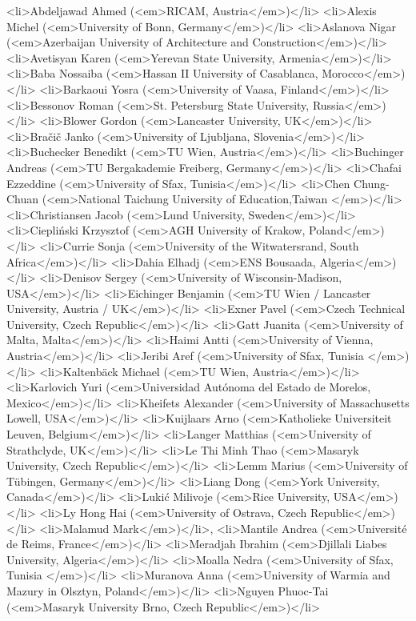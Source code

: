 <li>Abdeljawad Ahmed (<em>RICAM, Austria</em>)</li>
<li>Alexis Michel (<em>University of Bonn, Germany</em>)</li>
<li>Aslanova Nigar (<em>Azerbaijan University of Architecture and Construction</em>)</li>
<li>Avetisyan Karen (<em>Yerevan State University, Armenia</em>)</li>
<li>Baba Nossaiba (<em>Hassan II University of Casablanca, Morocco</em>)</li>
<li>Barkaoui Yosra (<em>University of Vaasa, Finland</em>)</li>
<li>Bessonov Roman (<em>St. Petersburg State University, Russia</em>)</li>
<li>Blower Gordon (<em>Lancaster University, UK</em>)</li>
<li>Bračič Janko (<em>University of Ljubljana, Slovenia</em>)</li>
<li>Buchecker Benedikt (<em>TU Wien, Austria</em>)</li>
<li>Buchinger Andreas (<em>TU Bergakademie Freiberg, Germany</em>)</li>
<li>Chafai Ezzeddine (<em>University of Sfax, Tunisia</em>)</li>
<li>Chen Chung-Chuan (<em>National Taichung University of Education,Taiwan </em>)</li>
<li>Christiansen Jacob (<em>Lund University, Sweden</em>)</li>
<li>Ciepliński Krzysztof (<em>AGH University of Krakow, Poland</em>)</li>
<li>Currie Sonja (<em>University of the Witwatersrand, South Africa</em>)</li>
<li>Dahia Elhadj (<em>ENS Bousaada, Algeria</em>)</li>
<li>Denisov Sergey (<em>University of Wisconsin-Madison, USA</em>)</li>
<li>Eichinger Benjamin (<em>TU Wien / Lancaster University, Austria / UK</em>)</li>
<li>Exner Pavel (<em>Czech Technical University, Czech Republic</em>)</li>
<li>Gatt Juanita (<em>University of Malta, Malta</em>)</li>
<li>Haimi Antti (<em>University of Vienna, Austria</em>)</li>
<li>Jeribi Aref (<em>University of Sfax, Tunisia </em>)</li>
<li>Kaltenbäck Michael (<em>TU Wien, Austria</em>)</li>
<li>Karlovich Yuri (<em>Universidad Autónoma del Estado de Morelos, Mexico</em>)</li>
<li>Kheifets Alexander (<em>University of Massachusetts Lowell, USA</em>)</li>
<li>Kuijlaars Arno (<em>Katholieke Universiteit Leuven, Belgium</em>)</li>
<li>Langer Matthias (<em>University of Strathclyde, UK</em>)</li>
<li>Le Thi Minh Thao (<em>Masaryk University, Czech Republic</em>)</li>
<li>Lemm Marius (<em>University of Tübingen, Germany</em>)</li>
<li>Liang Dong (<em>York University, Canada</em>)</li>
<li>Lukić Milivoje (<em>Rice University, USA</em>)</li>
<li>Ly Hong Hai (<em>University of Ostrava, Czech Republic</em>)</li>
<li>Malamud Mark</em>)</li>,
<li>Mantile Andrea (<em>Université de Reims, France</em>)</li>
<li>Meradjah Ibrahim (<em>Djillali Liabes University, Algeria</em>)</li>
<li>Moalla Nedra (<em>University of Sfax, Tunisia </em>)</li>
<li>Muranova Anna (<em>University of Warmia and Mazury in Olsztyn, Poland</em>)</li>
<li>Nguyen Phuoc-Tai (<em>Masaryk University Brno, Czech Republic</em>)</li>
